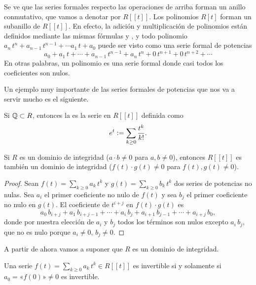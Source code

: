 \documentclass{article}
\numberwithin{equation}{section}
\theoremstyle{definition}
\begin{document}
Se ve que las series formales respecto las operaciones de arriba forman un
anillo conmutativo, que vamos a denotar por $R [\![t]\!]$. Los polinomios
$R [t]$ forman un subanillo de $R [\![t]\!]$. En efecto, la adición y
multiplicación de polinomios están definidos mediante las mismas fórmulas
 y
, y todo polinomio
$a_n\,t^n + a_{n-1}\,t^{n-1} + \cdots a_1\,t + a_0$ puede ser visto como una
serie formal de potencias
$$a_0 + a_1\,t + \cdots + a_{n-1}\,t^{n-1} + a_n\,t^n + 0\,t^{n+1} + 0\,t^{n+2} + \cdots$$
En otras palabras, un polinomio es una serie formal donde casi todos los
coeficientes son nulos.

Un ejemplo muy importante de las series formales de potencias que nos va a
servir mucho es el siguiente.

\begin{definicion}
  Si $\mathbb{Q} \subset R$, entonces la  es la serie
  en $R [\![t]\!]$ definida como
  $$e^t \mathrel{\mathop:}= \sum_{k \ge 0} \frac{t^k}{k!}.$$
\end{definicion}

\vspace{1em}

\begin{observacion}
  Si $R$ es un dominio de integridad ($a\cdot b \ne 0$ para $a,b\ne 0$),
  entonces $R [\![t]\!]$ es también un dominio de integridad
  ($f (t) \cdot g (t) \ne 0$ para $f (t), g(t) \ne 0$).

  \begin{proof}
    Sean $f (t) = \sum_{k \ge 0} a_k\,t^k$ y $g (t) = \sum_{k \ge 0} b_k\,t^k$
    dos series de potencias no nulas. Sea $a_i$ el primer coeficiente no nulo de
    $f (t)$ y sea $b_j$ el primer coeficiente no nulo en $g (t)$. El coeficiente
    de $t^{i+j}$ en $f (t) \cdot g (t)$ es
    $$a_0\,b_{i+j} + a_1\,b_{i+j-1} + \cdots + a_i\,b_j + a_{i+1}\,b_{j-1} + \cdots + a_{i+j}\,b_0,$$
    donde por nuestra elección de $a_i$ y $b_j$ todos los términos son nulos
    excepto $a_i\,b_j$, que no es nulo porque $a_i \ne 0$, $b_j \ne 0$.
  \end{proof}
\end{observacion}

A partir de ahora vamos a suponer que $R$ es un dominio de integridad.

\begin{observacion}
  \label{obs:series-formales-invertibles}
  Una serie $f (t) = \sum_{k \ge 0} a_k\,t^k \in R [\![t]\!]$ es invertible
  si y solamente si $a_0 = \text{«}f (0)\text{»} \ne 0$ es invertible.
\end{observacion}
\end{document}

